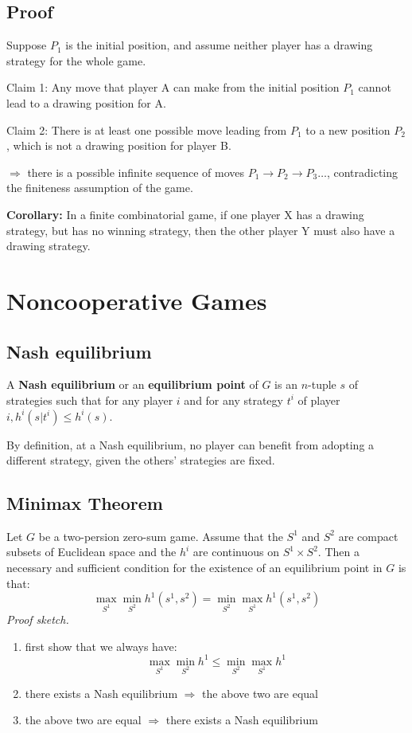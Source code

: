 \documentclass[11pt,a4paper]{article}
\begin{document}
\subsection{Proof}
Suppose $P_1$ is the initial position, and assume neither player has a drawing strategy for the whole game. \par
Claim 1: Any move that player A can make from the initial position $P_1$ cannot lead to a drawing position for A. \par
Claim 2: There is at least one possible move leading from $P_1$ to a new position $P_2$, which is not a drawing position for player B. \par
$\Rightarrow$ there is a possible infinite sequence of moves $P_1 \rightarrow P_2 \rightarrow P_3 \dots$, contradicting the finiteness assumption of the game. \par

\textbf{Corollary:} In a finite combinatorial game, if one player X has a drawing strategy, but has no winning strategy, then the other player Y must also have a drawing strategy. \par

\section{Noncooperative Games}
\subsection{Nash equilibrium}
A \textbf{Nash equilibrium} or an \textbf{equilibrium point} of $G$ is an $n$-tuple $s$ of strategies such that for any player $i$ and for any strategy $t^i$ of player $i, h^i(s|t^i) \leqslant h^i(s)$. \par
By definition, at a Nash equilibrium, no player can benefit from adopting a different strategy, given the others' strategies are fixed. 

\subsection{Minimax Theorem}
Let $G$ be a two-persion zero-sum game. Assume that the $S^1$ and $S^2$ are compact subsets of Euclidean space and the $h^i$ are continuous on $S^1 \times S^2$. Then a necessary and sufficient condition for the existence of an equilibrium point in $G$ is that:
\[
\max_{S^1} \min_{S^2} h^1(s^1, s^2) = \min_{S^2} \max_{S^1} h^1(s^1, s^2)
\]
\textit{Proof sketch.}
\begin{enumerate}
    \item [(1)] first show that we always have:
        \[
        \max_{S^1} \min_{S^2} h^1 \leqslant \min_{S^2} \max_{S^1} h^1 
        \]
        
    \item [(2)] there exists a Nash equilibrium $\Rightarrow$ the above two are equal
    \item [(3)] the above two are equal $\Rightarrow$ there exists a Nash equilibrium
\end{enumerate}
\end{document}
